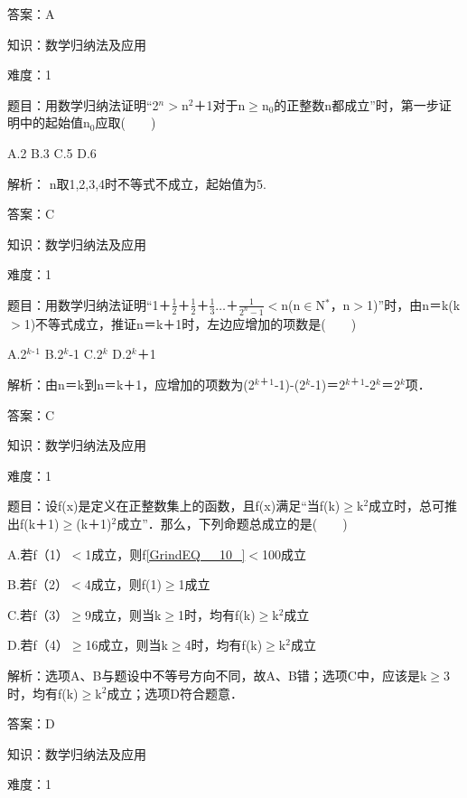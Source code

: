 \documentclass{article} %
\begin{document}
 答案：A



 知识：数学归纳法及应用

 难度：1

 题目：用数学归纳法证明``2${}^{n}$$\mathrm{>}$n${}^{2}$＋1对于n$\mathrm{\ge}$n${}_{0}$的正整数n都成立''时，第一步证明中的起始值n${}_{0}$应取(　　)

A.2  B.3  C.5  D.6

 解析： n取1,2,3,4时不等式不成立，起始值为5.

 答案：C

 

 知识：数学归纳法及应用

 难度：1

 题目：用数学归纳法证明``1＋$\frac{1}{2}$＋$\frac{1}{2}$＋$\frac{1}{3}${$\dots$}＋$\frac{1}{2^n-1}\mathrm{<}$n(n$\mathrm{\in}$N${}^{*}$，n$\mathrm{>}$1)''时，由n＝k(k$\mathrm{>}$1)不等式成立，推证n＝k＋1时，左边应增加的项数是(　　)

A.2${}^{k}$${}^{\textrm{-}}$${}^{1}$  B.2${}^{k}$-1  C.2${}^{k}$  D.2${}^{k}$＋1

 解析：由n＝k到n＝k＋1，应增加的项数为(2${}^{k}$${}^{\textrm{＋}}$${}^{1}$-1)-(2${}^{k}$-1)＝2${}^{k}$${}^{\textrm{＋}}$${}^{1}$-2${}^{k}$＝2${}^{k}$项．

 答案：C

 

 知识：数学归纳法及应用

 难度：1

 题目：设f(x)是定义在正整数集上的函数，且f(x)满足``当f(k)$\mathrm{\ge}$k${}^{2}$成立时，总可推出f(k＋1)$\mathrm{\ge}$(k＋1)${}^{2}$成立''．那么，下列命题总成立的是(　　)

A.若f（1）$\mathrm{<}$1成立，则f\eqref{GrindEQ__10_}$\mathrm{<}$100成立

B.若f（2）$\mathrm{<}$4成立，则f(1)$\mathrm{\ge}$1成立

C.若f（3）$\mathrm{\ge}$9成立，则当k$\mathrm{\ge}$1时，均有f(k)$\mathrm{\ge}$k${}^{2}$成立

D.若f（4）$\mathrm{\ge}$16成立，则当k$\mathrm{\ge}$4时，均有f(k)$\mathrm{\ge}$k${}^{2}$成立

 解析：选项A、B与题设中不等号方向不同，故A、B错；选项C中，应该是k$\mathrm{\ge}$3时，均有f(k)$\mathrm{\ge}$k${}^{2}$成立；选项D符合题意．

 答案：D

 

 知识：数学归纳法及应用

 难度：1
\end{document}

